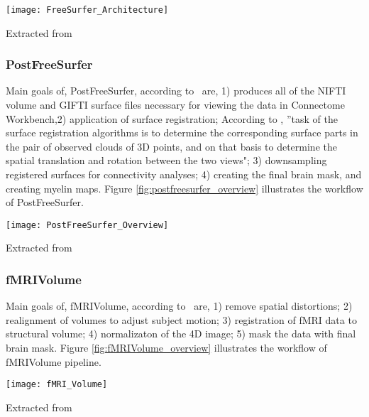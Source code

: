 \begin{center}
  \texttt{[image: FreeSurfer\_Architecture]}
  \label{fig:freesurfer_overview}
  \caption*{Extracted from \cite{Gla13}}
\end{center}

\subsubsection{PostFreeSurfer}
Main goals of, PostFreeSurfer, according to~\cite{Gla13} are, 1) produces all of the NIFTI volume and GIFTI surface files necessary for viewing the data in Connectome Workbench,2) application of surface registration; According to \cite{DBLP:journals/corr/HrgeticP13}, ''task of the surface registration algorithms is to determine the corresponding surface parts in the pair of observed clouds of 3D points, and on that basis to determine the spatial translation and rotation between the two views"; 3) downsampling registered surfaces for connectivity analyses; 4) creating the final brain mask, and creating myelin maps. Figure \ref{fig:postfreesurfer_overview} illustrates the workflow of PostFreeSurfer.\\

\begin{center}
  \texttt{[image: PostFreeSurfer\_Overview]}
  \label{fig:postfreesurfer_overview}
  \caption*{Extracted from \cite{Gla13}}
\end{center}

\subsubsection{fMRIVolume}
Main goals of, fMRIVolume, according to~\cite{Gla13} are, 1) remove spatial distortions; 2) realignment of volumes to adjust subject motion; 3) registration of fMRI data to structural volume; 4) normalizaton of the 4D image; 5) mask the data with final brain mask. Figure \ref{fig:fMRIVolume_overview} illustrates the workflow of fMRIVolume pipeline.\\

\begin{center}
  \texttt{[image: fMRI\_Volume]}
  \label{fig:fMRIVolume_overview}
  \caption*{Extracted from \cite{Gla13}}
\end{center}

